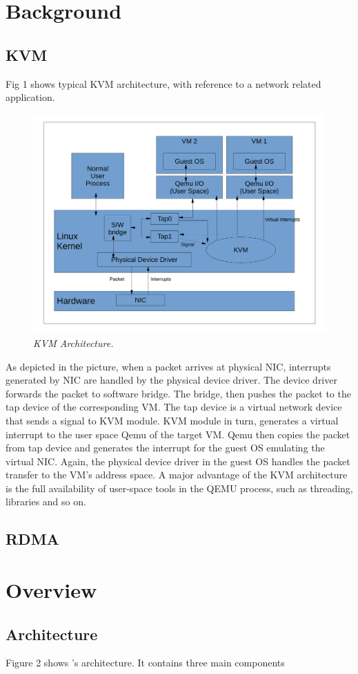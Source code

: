 \section{Background} \label{sec:background}

\subsection{KVM} \label{sec:kvm}

Fig 1 shows typical KVM architecture, with reference to a network related
application. 

\begin{figure}[t]
\centering
\includegraphics[width=.47\textwidth]{figures/kvm}
\vspace{-.2in}
\caption{{\em KVM Architecture.}} \label{fig:kvm}
\vspace{.05in}
\end{figure}

As depicted in the picture, when a packet arrives at physical NIC,
interrupts generated by NIC are handled by the physical device driver. The device
driver forwards the packet to software bridge. The bridge, then pushes the packet
to the tap device of the corresponding VM. The tap device is a virtual network
device that sends a signal to KVM module. KVM module in turn, generates a virtual
interrupt to the user space Qemu of the target VM. Qemu then copies the packet from
tap device and generates the interrupt for the guest OS emulating the virtual NIC.
Again, the physical device driver in the guest OS handles the packet transfer to
the VM’s address space. A major advantage of the KVM architecture is the full
availability of user-space tools in the QEMU process, such as threading, libraries
and so on.

\subsection{\paxos}\label{sec:paxos}

\subsection{RDMA} \label{sec:rdma}

\section{\xxx Overview} \label{sec:overview}

\subsection{Architecture} \label{sec:arch}

Figure 2 shows \xxx's architecture. It contains three main components
